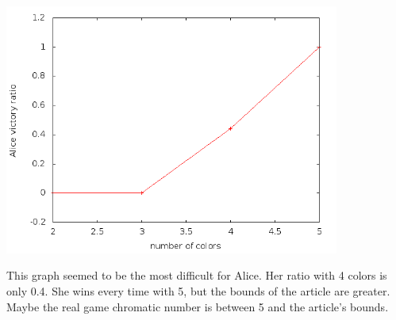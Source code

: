 \includegraphics[width=11cm]{resultats/icosaedre.png}

This graph seemed to be the most difficult for Alice. Her ratio with 4 colors is only 0.4. She wins every time with 5, but the bounds of the article are greater. Maybe the real game chromatic number is between 5 and the article's bounds.